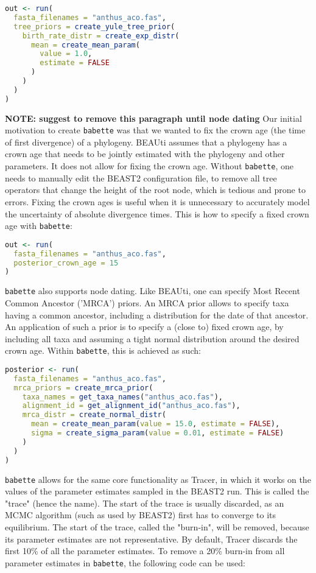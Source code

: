\documentclass{article}
\begin{document}
\begin{lstlisting}[language=R, floatplacement=H]
out <- run(
  fasta_filenames = "anthus_aco.fas",
  tree_priors = create_yule_tree_prior(
    birth_rate_distr = create_exp_distr(
      mean = create_mean_param(
        value = 1.0, 
        estimate = FALSE
      )
    )    
  )
)
\end{lstlisting}
\textbf{NOTE: suggest to remove this paragraph until node dating}
Our initial motivation to create \verb;babette; 
was that we wanted to fix the crown age (the time of first divergence) of a phylogeny.
BEAUti assumes that a phylogeny has a crown age that needs to be 
jointly estimated with the phylogeny and other parameters. 
It does not allow for fixing the crown age. 
Without \verb;babette;, one needs to manually edit the BEAST2 
configuration file, to remove all tree operators that change the height of the root node,
which is tedious and prone to errors.
Fixing the crown ages is useful when it is unnecessary 
to accurately model the uncertainty of absolute divergence times.
This is how to specify a fixed crown age with \verb;babette;:

\begin{lstlisting}[language=R, floatplacement=H]
out <- run(
  fasta_filenames = "anthus_aco.fas",
  posterior_crown_age = 15
)
\end{lstlisting}
\verb;babette; also supports node dating. Like BEAUti, one
can specify Most Recent Common Ancestor ('MRCA') priors.
An MRCA prior allows to specify taxa having a common ancestor,
including a distribution for the date of that ancestor.
An application of such a prior is to specify a (close to) fixed
crown age, by including all taxa and assuming a tight 
normal distribution around the desired crown age. 
Within \verb;babette;, this is achieved as such:

\begin{lstlisting}[language=R, floatplacement=H]
posterior <- run(
  fasta_filenames = "anthus_aco.fas",
  mrca_priors = create_mrca_prior(
    taxa_names = get_taxa_names("anthus_aco.fas"),
    alignment_id = get_alignment_id("anthus_aco.fas"),
    mrca_distr = create_normal_distr(
      mean = create_mean_param(value = 15.0, estimate = FALSE),
      sigma = create_sigma_param(value = 0.01, estimate = FALSE)
    )
  )
)
\end{lstlisting}
\verb;babette; allows for the same core functionality as Tracer,
in which it works on the values of the parameter estimates sampled
in the BEAST2 run. This is called the "trace" (hence the name).
The start of the trace is usually discarded, as an MCMC 
algorithm (such as used by BEAST2) first has to converge to
its equilibrium. The start of the trace, called the "burn-in", 
will be removed, because its parameter estimates are not 
representative. By default, Tracer discards the first 10\% of all 
the parameter estimates. 
To remove a 20\% burn-in from all parameter estimates 
in \verb;babette;, the following code can be used:
\end{document}
